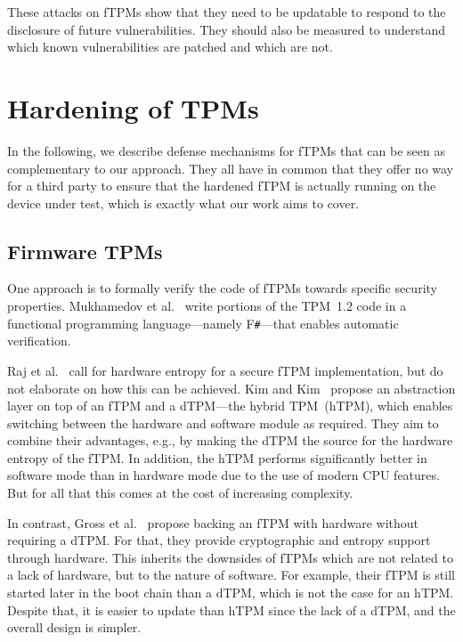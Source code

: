 These attacks on \acp{fTPM} show that they need to be updatable to respond to the disclosure of future vulnerabilities.
They should also be measured to understand which known vulnerabilities are patched and which are not.

\section{Hardening of TPMs}

In the following, we describe defense mechanisms for fTPMs that can be seen as complementary to our approach.
They all have in common that they offer no way for a third party to ensure that the hardened fTPM is actually running on the device under test, which is exactly what our work aims to cover.

\subsection{Firmware TPMs}

One approach is to formally verify the code of fTPMs towards specific security properties.
Mukhamedov et al.~\cite{Mukhamedov2013} write portions of the TPM~1.2 code in a functional programming language---namely F\texttt{\#}---that enables automatic verification.

Raj et al.~\cite{Raj2015} call for hardware entropy for a secure \ac{fTPM} implementation, but do not elaborate on how this can be achieved.
Kim and Kim~\cite{Kim2019} propose an abstraction layer on top of an \ac{fTPM} and a \ac{dTPM}---the hybrid TPM~(hTPM), which enables switching between the hardware and software module as required.
They aim to combine their advantages, e.g., by making the dTPM the source for the hardware entropy of the fTPM\@.
In addition, the hTPM performs significantly better in software mode than in hardware mode due to the use of modern CPU features.
But for all that this comes at the cost of increasing complexity.

In contrast, Gross et al.~\cite{Gross2021} propose backing an \ac{fTPM} with hardware without requiring a \ac{dTPM}.
For that, they provide cryptographic and entropy support through hardware.
This inherits the downsides of \acp{fTPM} which are not related to a lack of hardware, but to the nature of software.
For example, their \ac{fTPM} is still started later in the boot chain than a \ac{dTPM}, which is not the case for an hTPM\@.
Despite that, it is easier to update than hTPM since the lack of a dTPM, and the overall design is simpler.

